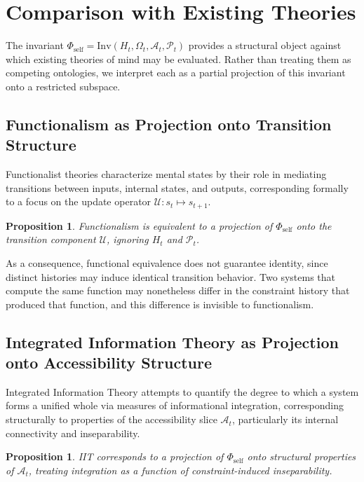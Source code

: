 \documentclass[12pt, a4paper]{article}
\theoremstyle{plain}
\newtheorem{proposition}[theorem]{Proposition}
\theoremstyle{definition}
\theoremstyle{remark}
\begin{document}
\section{Comparison with Existing Theories}

The invariant $\Phi_{\mathrm{self}} = \mathrm{Inv}(H_t, \Omega_t, \mathcal{A}_t, \mathcal{P}_t)$ provides a structural object against which existing theories of mind may be evaluated. Rather than treating them as competing ontologies, we interpret each as a partial projection of this invariant onto a restricted subspace.

\subsection{Functionalism as Projection onto Transition Structure}

Functionalist theories characterize mental states by their role in mediating transitions between inputs, internal states, and outputs, corresponding formally to a focus on the update operator $\mathcal{U} : s_t \mapsto s_{t+1}$.

\begin{proposition}
Functionalism is equivalent to a projection of $\Phi_{\mathrm{self}}$ onto the transition component $\mathcal{U}$, ignoring $H_t$ and $\mathcal{P}_t$.
\end{proposition}

As a consequence, functional equivalence does not guarantee identity, since distinct histories may induce identical transition behavior. Two systems that compute the same function may nonetheless differ in the constraint history that produced that function, and this difference is invisible to functionalism.

\subsection{Integrated Information Theory as Projection onto Accessibility Structure}

Integrated Information Theory attempts to quantify the degree to which a system forms a unified whole via measures of informational integration, corresponding structurally to properties of the accessibility slice $\mathcal{A}_t$, particularly its internal connectivity and inseparability.

\begin{proposition}
IIT corresponds to a projection of $\Phi_{\mathrm{self}}$ onto structural properties of $\mathcal{A}_t$, treating integration as a function of constraint-induced inseparability.
\end{proposition}
\end{document}
